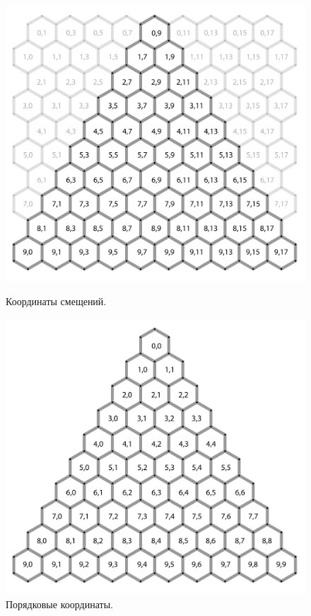 \begin{figure}[h]
\begin{center}
\begin{minipage}[h]{0.47\linewidth}
\includegraphics[width=1\linewidth]{inc/img/hexagon_offset}
\caption{Координаты смещений.} 
\label{axis:offset} 
\end{minipage}
\hfill 
\begin{minipage}[h]{0.47\linewidth}
\includegraphics[width=1\linewidth]{inc/img/hexagon_ordinal}
\caption{Порядковые координаты.}
\label{axis:ordinal}
\end{minipage}
\end{center}
\end{figure}


